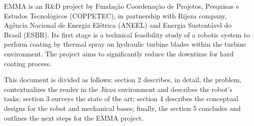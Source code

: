 EMMA is an R\&D project by Fundação Coordenação de Projetos, Pesquisas e Estudos
Tecnológicos (COPPETEC), in partnership with Rijeza company, Agência Nacional de
Energia Elétrica (ANEEL) and Energia Sustentável do Brasil (ESBR). Its first
stage is a technical feasibility study of a robotic system to perform
coating by thermal spray on hydraulic turbine blades within the turbine
environment. The project aims to significantly reduce the downtime for hard
coating process.

This document is divided as follows: section 2 describes, in detail, the
problem, contextualizes the reader in the Jirau environment and
describes the robot's tasks; section 3 surveys the state of the
art; section 4 describes the conceptual designs for the robot and mechanical
bases; finally, the section 5 concludes and outlines the next steps for the
EMMA project.
